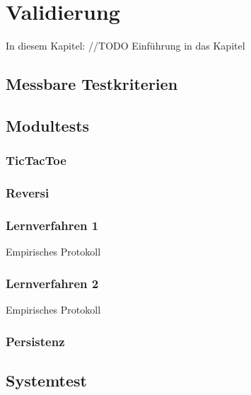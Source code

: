 \chapter{Validierung}
\label{cha:validierung}

In diesem Kapitel: //TODO Einführung in das Kapitel

\section{Messbare Testkriterien}

\section{Modultests}

\subsection{TicTacToe}

\subsection{Reversi}

\subsection{Lernverfahren 1}
Empirisches Protokoll

\subsection{Lernverfahren 2}
Empirisches Protokoll

\subsection{Persistenz}

\section{Systemtest}
